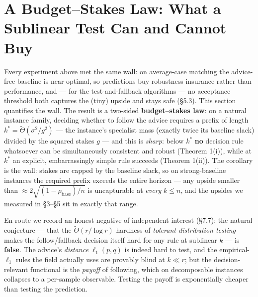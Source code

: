 \section{A Budget--Stakes Law: What a Sublinear Test Can and Cannot
Buy}

Every experiment above met the same wall: on average-case matching the
advice-free baseline is near-optimal, so predictions buy robustness
insurance rather than performance, and --- for the test-and-fallback
algorithms --- no acceptance threshold both captures the (tiny) upside
and stays safe (§5.3). This section quantifies the wall. The result is a
two-sided \textbf{budget--stakes law}: on a natural instance family,
deciding whether to follow the advice requires a prefix of length
\(k^* = \tilde\Theta(\sigma^2/g^2)\) --- the instance's specialist mass
(exactly twice its baseline slack) divided by the squared stakes \(g\)
--- and this is \emph{sharp}: below \(k^*\) \textbf{no} decision rule
whatsoever can be simultaneously consistent and robust (Theorem 1(i)),
while at \(k^*\) an explicit, embarrassingly simple rule succeeds
(Theorem 1(ii)). The corollary is the wall: stakes are capped by the
baseline slack, so on strong-baseline instances the required prefix
exceeds the entire horizon --- any upside smaller than
\(\approx 2\sqrt{(1-\rho_{\mathrm{base}})/n}\) is uncapturable at
\emph{every} \(k\le n\), and the upsides we measured in §3--§5 sit in
exactly that range.

En route we record an honest negative of independent interest (§7.7):
the natural conjecture --- that the \(\tilde\Theta(r/\log r)\) hardness
of \emph{tolerant distribution testing}
\cite{canonne2022tolerance,valiant2011unseen,jiao2018l1} makes the
follow/fallback decision itself hard for any rule at sublinear \(k\) ---
is \textbf{false}. The advice's \emph{distance} \(\ell_1(p,q)\) is
indeed hard to test, and the empirical-\(\ell_1\) rules the field
actually uses \cite{choo2024imperfect,bem2026testmatch} are provably
blind at \(k \ll r\); but the decision-relevant functional is the
\emph{payoff} of following, which on decomposable instances collapses to
a per-sample observable. Testing the payoff is exponentially cheaper
than testing the prediction.

